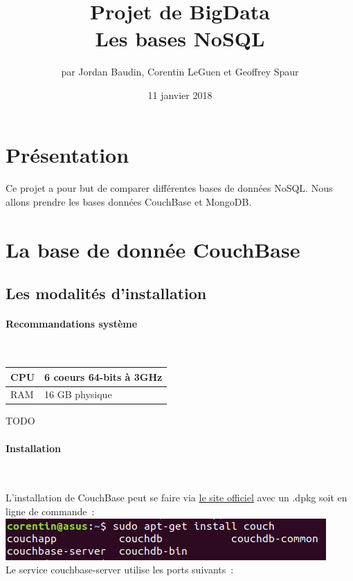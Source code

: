 \documentclass{article}
\title{Projet de BigData \\ Les bases NoSQL}
\author{par Jordan Baudin, Corentin LeGuen et Geoffrey Spaur}
\date{11 janvier 2018}
\begin{document}
\maketitle
\newpage
\tableofcontents{}
\newpage
\section{Présentation}
  \paragraph{}
  Ce projet a pour but de comparer différentes bases de données NoSQL.
  Nous allons prendre les bases données CouchBase et MongoDB.
  
 \newpage
\section{La base de donnée CouchBase}
\subsection{Les modalités d’installation}
  \paragraph{Recommandations système} \
  \
    \begin{tabular}{|l|l|}
      \hline
      CPU & 6 coeurs 64-bits à 3GHz \\ \hline
      RAM & 16 GB physique          \\ \hline
    \end{tabular}
    TODO
  
  \paragraph{Installation} \
  
  L’installation de CouchBase peut se faire via \href{https://www.couchbase.com/}{le site officiel} avec un .dpkg soit en ligne de commande :\\
  
  \includegraphics[scale=0.8]{couchBase/install.png}\\

  Le service couchbase-server utilise les ports suivants :\\
\end{document}
